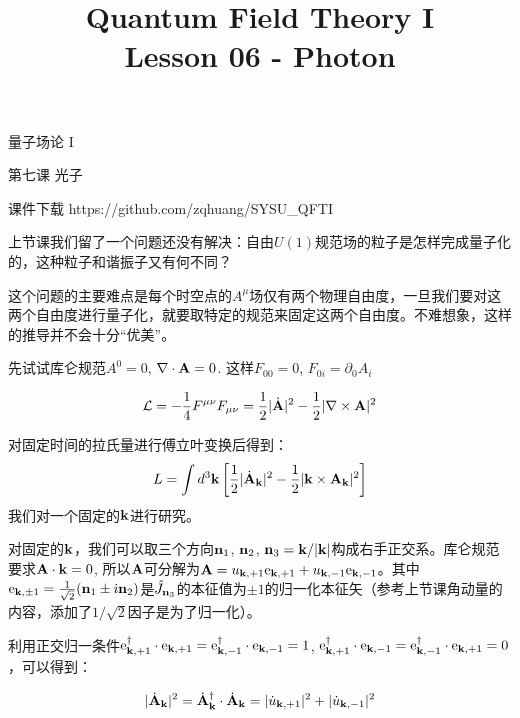 \documentclass[CJK]{beamer}
\title{Quantum Field Theory I \\ Lesson 06 - Photon}
\author{}
\date{}
\begin{document}
\begin{frame}
 
\begin{center}
\begin{Large}
\bch
量子场论 I 

{\vskip 0.3in}

第七课 光子

\ech
\end{Large}
\end{center}

\vskip 0.2in

\bch
课件下载
\ech
https://github.com/zqhuang/SYSU\_QFTI

\end{frame}



\begin{frame}
\bch
上节课我们留了一个问题还没有解决：自由$U(1)$规范场的粒子是怎样完成量子化的，这种粒子和谐振子又有何不同？

\skipline
这个问题的主要难点是每个时空点的$A^\mu$场仅有两个物理自由度，一旦我们要对这两个自由度进行量子化，就要取特定的规范来固定这两个自由度。不难想象，这样的推导并不会十分“优美”。

\ech
\end{frame}

\begin{frame}
\bch
先试试库仑规范$A^0 = 0$, $\nabla \cdot {\mathbf{A}} = 0$.
这样$F_{00} = 0$, $F_{0i} = \partial_0 A_i$

$$ {\mathcal{L}} = -\frac{1}{4} {F^{\mu\nu}}{F_{\mu\nu}} = \frac{1}{2} |\dot{{\mathbf{A}}}|^2  - \frac{1}{2}|\nabla \times {\mathbf{A}}|^2$$

对固定时间的拉氏量进行傅立叶变换后得到：
$$L = \int d^3{\mathbf{k}} \left[\frac{1}{2} |\dot{{\mathbf{A}}}_{\mathbf{k}}|^2  - \frac{1}{2}|{\mathbf{k}} \times {\mathbf{A}}_{\mathbf{k}}|^2\right]$$
我们对一个固定的${\mathbf{k}}$进行研究。

\ech
\end{frame}

\begin{frame}
\bch
对固定的${\mathbf{k}}$，我们可以取三个方向${\mathbf{n}}_1$, ${\mathbf{n}}_2$, ${\mathbf{n}}_3 = {\mathbf{k}} / |{\mathbf{k}}|$构成右手正交系。库仑规范要求${\mathbf{A}}\cdot{\mathbf{k}} = 0$, 所以${\mathbf{A}}$可分解为${\mathbf{A}} = u_{{\mathbf{k}},+1} \mathrm{e}_{{\mathbf{k}},+1} + u_{{\mathbf{k}},-1} \mathrm{e}_{{\mathbf{k}},-1}$。其中$\mathrm{e}_{{\mathbf{k}},\pm 1} = \frac{1}{\sqrt{2}}({\mathbf{n}}_1\pm {\dot{\imath}} {\mathbf{n}}_2)$是$\hat{J}_{{\mathbf{n}}_3}$的本征值为$\pm 1$的归一化本征矢（参考上节课角动量的内容，添加了$1/\sqrt{2}$因子是为了归一化）。

利用正交归一条件$\mathrm{e}_{{\mathbf{k}},+1}^\dagger \cdot \mathrm{e}_{{\mathbf{k}},+1} = \mathrm{e}_{{\mathbf{k}},-1}^\dagger \cdot \mathrm{e}_{{\mathbf{k}},-1} = 1$, $\mathrm{e}_{{\mathbf{k}},+1}^\dagger \cdot \mathrm{e}_{{\mathbf{k}},-1} = \mathrm{e}_{{\mathbf{k}},-1}^\dagger \cdot \mathrm{e}_{{\mathbf{k}},+1} = 0$，可以得到：

$$|\dot{{\mathbf{A}}}_{\mathbf{k}}|^2 = \dot{{\mathbf{A}}}_{\mathbf{k}}^\dagger \cdot \dot{{\mathbf{A}}}_{\mathbf{k}} = |\dot u_{{\mathbf{k}},+1}|^2 + |\dot u_{{\mathbf{k}},-1}|^2$$

\ech
\end{frame}
\end{document}
